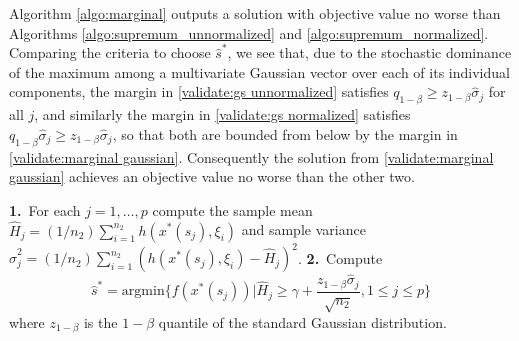 \documentclass[mnsc,blindrev]{informs4} %
\begin{document}
Algorithm \ref{algo:marginal} outputs a solution with objective value no worse than Algorithms \ref{algo:supremum_unnormalized} and \ref{algo:supremum_normalized}. Comparing the criteria to choose $\hat s^*$, we see that, due to the stochastic dominance of the maximum among a multivariate Gaussian vector over each of its individual components, the margin in \eqref{validate:gs unnormalized} satisfies $q_{1-\beta}\geq z_{1-\beta}\hat\sigma_j$ for all $j$, and similarly the margin in \eqref{validate:gs normalized} satisfies $q_{1-\beta}\hat\sigma_j\geq z_{1-\beta}\hat\sigma_j$, so that both are bounded from below by the margin in \eqref{validate:marginal gaussian}. Consequently the solution from \eqref{validate:marginal gaussian} achieves an objective value no worse than the other two.



\begin{algorithm}
\caption{$V$: Univariate Gaussian Validator}
\label{algo:marginal}
\begin{algorithmic}
\vspace{1ex}
\STATE \textbf{1.}~For each $j=1,\ldots,p$ compute the sample mean $\hat H_j=(1/n_2)\sum_{i=1}^{n_2}h(x^*(s_j),\xi_i)$ and sample variance $\hat \sigma_j^2=(1/n_2)\sum_{i=1}^{n_2}(h(x^*(s_j),\xi_i)-\hat H_j)^2$.
\STATE \textbf{2.}~Compute
\begin{equation}\label{validate:marginal gaussian}
   \hat s^* = \text{argmin}\Bigg\{f(x^*(s_j))\Big\vert \hat H_j\geq \gamma + \frac{z_{1-\beta}\hat \sigma_j}{\sqrt{n_2}},1\leq j\leq p\Bigg\}
\end{equation}
where $z_{1-\beta}$ is the $1-\beta$ quantile of the standard Gaussian distribution.
\vspace{1ex}
\end{algorithmic}
\end{algorithm}
\end{document}
